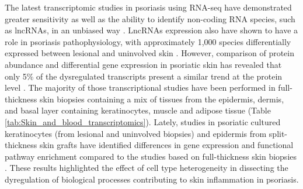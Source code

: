 The latest transcriptomic studies in psoriasis using RNA-seq have demonstrated greater sensitivity as well as the ability to identify non-coding RNA species, such as lncRNAs, in an unbiased way \parencite{Jabbari2012, Li2014,Tsoi2015}. LncRNAs expression also have shown to have a role in psoriasis pathophysiology, with approximately 1,000 species differentially expressed between lesional and uninvolved skin \parencite{Tsoi2015}. However, comparison of protein abundance and differential gene expression in psoriatic skin has revealed that only 5\% of the dysregulated transcripts present a similar trend at the protein level \parencite{Swindell2015}. The majority of those transcriptional studies have been performed in full-thickness skin biopsies containing a mix of tissues from the epidermis, dermis, and basal layer containing keratinocytes, muscle and adipose tissue (Table \ref{tab:Skin_and_blood_transcriptomics}). Lately, studies in psoriatic cultured keratinocytes (from lesional and uninvolved biopsies) and epidermis from split-thickness skin grafts have identified differences in gene expression and functional pathway enrichment compared to the studies based on full-thickness skin biopsies \parencite{Swindell2017,Tervaniemi2016}. These results highlighted the effect of cell type heterogeneity in dissecting the dyregulation of biological processes contributing to skin inflammation in psoriasis.


